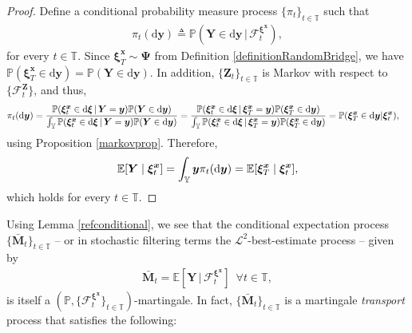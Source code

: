 \documentclass{article}
\def\P{\mathbb{P}}
\def\E{\mathbb{E}}
\def\T{\mathbb{T}}
\def\dd{\mathrm{d}}
\def\F{\mathcal{F}}
\def\xib{\boldsymbol{\xi}}
\theoremstyle{definition}
\begin{document}
\begin{proof}
Define a conditional probability measure process $\{\pi_{t}\}_{t\in\T}$ such that
\begin{align}
\pi_{t}(\dd \boldsymbol{y}) \triangleq \mathbb{P}(\boldsymbol{Y} \in \dd \boldsymbol{y} \,| \,\mathcal{F}^{\xib^{\boldsymbol{x}}}_{t}), \label{measurevaluedprocess}
\end{align}
for every $t\in\T$. Since $\xib^{\boldsymbol{x}}_{T}\sim\boldsymbol{\Psi}$ from Definition \ref{definitionRandomBridge}, we have $\mathbb{P}(\xib^{\boldsymbol{x}}_{T} \in \dd \boldsymbol{y}) = \mathbb{P}(\boldsymbol{Y} \in \dd \boldsymbol{y})$. In addition, $\{\boldsymbol{Z}_t\}_{t\in\T}$ is Markov with respect to $\{\F_t^{\boldsymbol{Z}}\}$, and thus,
\begin{align}
\pi_{t}(\dd \boldsymbol{y}) &= \frac{\mathbb{P}(\xib^{\boldsymbol{x}}_{t} \in \dd \xib \,|\, \boldsymbol{Y} =  \boldsymbol{y})\mathbb{P}(\boldsymbol{Y} \in \dd \boldsymbol{y})}{\int_{\mathbb{Y}}\mathbb{P}(\xib^{\boldsymbol{x}}_{t} \in \dd \xib \,|\, \boldsymbol{Y} =  \boldsymbol{y})\mathbb{P}(\boldsymbol{Y} \in \dd \boldsymbol{y})} = \frac{\mathbb{P}(\xib^{\boldsymbol{x}}_{t} \in \dd \xib \,|\, \xib^{\boldsymbol{x}}_T = \boldsymbol{y})\mathbb{P}(\xib^{\boldsymbol{x}}_{T} \in \dd \boldsymbol{y})}{\int_{\mathbb{Y}}\mathbb{P}(\xib^{\boldsymbol{x}}_{t} \in \dd \xib \,|\, \xib^{\boldsymbol{x}}_{T} = \boldsymbol{y})\mathbb{P}(\xib^{\boldsymbol{x}}_{T} \in \dd \boldsymbol{y})} = \mathbb{P}(\xib^{\boldsymbol{x}}_{T} \in \dd \boldsymbol{y} | \xib^{\boldsymbol{x}}_{t}), \notag
\end{align}
using Proposition \ref{markovprop}. Therefore,
\begin{align}
\mathbb{E}[\boldsymbol{Y} \mid \boldsymbol{\xi}^{\boldsymbol{x}}_t] = \int_{\mathbb{Y}} \boldsymbol{y}\pi_{t}(\dd \boldsymbol{y})= \mathbb{E}[\boldsymbol{\xi}^{\boldsymbol{x}}_T \mid \boldsymbol{\xi}^{\boldsymbol{x}}_t], \notag
\end{align}
which holds for every $t\in\T$.
\end{proof}
Using Lemma \ref{refconditional}, we see that the conditional expectation process $\{\bar{\mathbf{M}}_t\}_{t\in\T}$ -- or in stochastic filtering terms the $\mathcal{L}^2$-best-estimate process -- given by
\begin{align}
\bar{\mathbf{M}}_t = \E\left[ \boldsymbol{Y} \, | \, \F_{t}^{\xib^{\boldsymbol{x}}} \right] \,\,\, \forall t \in \T, \label{equilibriummartingale}
\end{align}
is itself a $(\P,\{\F_{t}^{\xib^{\boldsymbol{x}}}\}_{t\in\T})$-martingale. In fact, $\{\bar{\mathbf{M}}_t\}_{t\in\T}$ is a martingale \textit{transport} process that satisfies the following:
\end{document}
